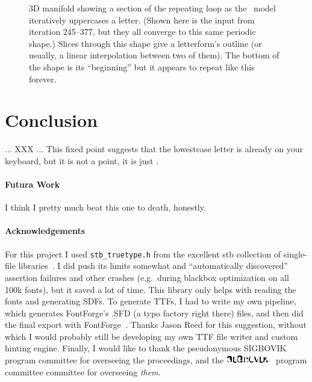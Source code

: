 \documentclass[twocolumn]{article}
\newcommand\upsigbovik{
  \includegraphics[height=1em]{upsigbovik}
}
\begin{document}
\begin{figure}[t]
\caption{ 3D manifold showing a section of the repeating loop as the
  \makeuppercase\ model iteratively uppercases a letter. (Shown here
  is the input  from iteration 245--377, but they all
  converge to this same periodic shape.) Slices through this shape give a
  letterform's outline (or usually, a linear interpolation between two
  of them). The bottom of the shape is its ``beginning'' but it
  appears to repeat like this forever.
} \label{fig:uppestcase3d}
\end{figure}


\section{Conclusion}
... XXX ...
This fixed point
suggests that the lowestcase letter is already on your keyboard,
but it is not a point, it is just .

\paragraph{Futura Work}
I think I pretty much beat this one to death, honestly.

\paragraph{Acknowledgements}
For this project I used \verb+stb_truetype.h+ from the excellent stb
collection of single-file libraries~\cite{stb}. I did push its limits
somewhat and ``automatically discovered'' assertion failures and other
crashes (e.g.~during blackbox optimization on all 100k fonts), but it
saved a lot of time. This library only helps with reading the fonts
and generating SDFs. To generate TTFs, I had to write my own pipeline,
which generates FontForge's .SFD (a typo factory right there) files,
and then did the final export with FontForge~\cite{fontforge}. Thanks
Jason Reed for this suggestion, without which I would probably still
be developing my own TTF file writer and custom hinting engine. Finally,
I would like to thank the pseudonymous SIGBOVIK program committee for
overseeing the proceedings, and the \upsigbovik\ program committee
committee for overseeing {\em them}.


{}

\end{document}
